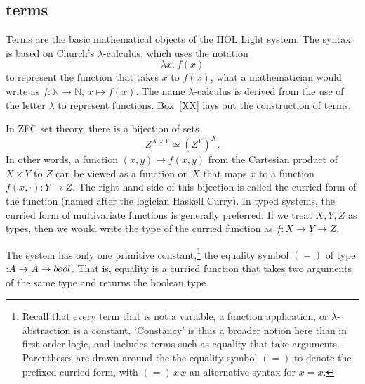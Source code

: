 \documentclass{llncs}
\def\tc{\hbox{:}}
\newcommand{\ring}[1]{\mathbb{#1}}
\begin{document}
\subsection{terms}

Terms are the basic mathematical objects of the HOL Light system.  The syntax is based
on Church's $\lambda$-calculus, which uses the notation
   $$
   \lambda x.\ f (x)
   $$
to represent the function that takes $x$ to $f(x)$, what a mathematician would write
as $f:\ring{N}\to\ring{N}$, $x\mapsto f(x)$.  The name $\lambda$-calculus is derived
from the use of the letter $\lambda$ to represent functions.  Box~\ref{XX} lays out
the construction of terms.



In ZFC set theory, there is a bijection of sets
  $$
  Z^{X \times Y} \simeq (Z^Y)^X.
  $$
In other words, a function $(x,y)\mapsto f(x,y)$
from the Cartesian product of $X \times Y$ to $Z$ can be viewed as a function on
$X$ that maps $x$ to a function $f(x,\cdot):Y\to Z$.  The right-hand side of this
bijection is called the curried form of the function (named after the logician Haskell Curry).  
In typed systems, the curried form of multivariate functions is generally preferred.  If we
treat $X,Y,Z$ as types, then we would write the type of the curried function as
$f:X\to Y \to Z$.

The system has only one primitive constant,\footnote{Recall that every term that is
not a variable, a function application, or $\lambda$-abstraction is a constant.  `Constancy' is thus a broader notion here than in first-order logic, and includes terms
such as equality that take arguments.  Parentheses are drawn around the the
equality symbol $( = )$ to denote the prefixed curried form, with
$( = )\, x\, x$ an alternative syntax for $x = x$.}  
the equality symbol $( = )$
of type $\tc A\to A\to  bool$.  
That is, equality is a curried function that takes two arguments of the same type
and returns the boolean type.
\end{document}
